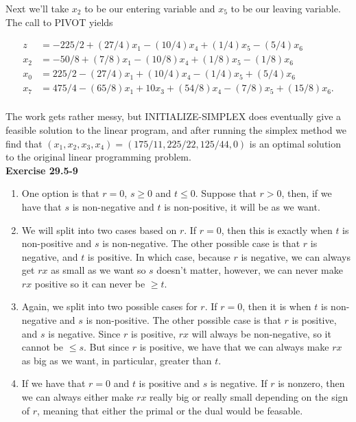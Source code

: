 \documentclass{article}
\begin{document}
Next we'll take $x_2$ to be our entering variable and $x_5$ to be our leaving variable.  The call to PIVOT yields

\begin{align*}
z &=  -225/2 + (27/4)x_1 - (10/4)x_4 + (1/4)x_5 - (5/4)x_6 \\
x_2 &= -50/8 + (7/8)x_1 - (10/8)x_4 + (1/8)x_5 - (1/8)x_6  \\
x_0 &= 225/2 - (27/4)x_1 + (10/4)x_4 - (1/4)x_5 + (5/4)x_6\\
x_7 &= 475/4 - (65/8)x_1 + 10x_3 + (54/8)x_4 - (7/8)x_5 + (15/8)x_6.\\
\end{align*}

The work gets rather messy, but INITIALIZE-SIMPLEX does eventually give a feasible solution to the linear program, and after running the simplex method we find that $(x_1,x_2,x_3,x_4) = (175/11,225/22,125/44,0)$ is an optimal solution to the original linear programming problem.  \\

\noindent\textbf{Exercise 29.5-9}\\

\begin{enumerate}[1.]
\item
One option is that $r= 0$, $s\ge 0$ and $t\le 0$. Suppose that $r>0$, then, if we have that $s$ is non-negative and $t$ is non-positive, it will be as we want. 
\item
We will split into two cases based on $r$. If $r=0$, then this is exactly when $t$ is non-positive and $s$ is non-negative.
The other possible case is that $r$ is negative, and $t$ is positive. In which case, because $r$ is negative, we can always get $rx$ as small as we want so $s$ doesn't matter, however, we can never make $rx$ positive so it can never be $\ge t$.
\item
Again, we split into two possible cases for $r$. If $r=0$, then it is when $t$ is non-negative and $s$ is non-positive. The other possible case is that $r$ is positive, and $s$ is negative. Since $r$ is positive, $rx$ will always be non-negative, so it cannot be $\le s$. But since $r$ is positive, we have that we can always make $rx$ as big as we want, in particular, greater than $t$.
\item
If we have that $r=0$ and $t$ is positive and $s$ is negative. If $r$ is nonzero, then we can always either make $rx$ really big or really small depending on the sign of $r$, meaning that either the primal or the dual would be feasable.

\end{enumerate}
\end{document}
